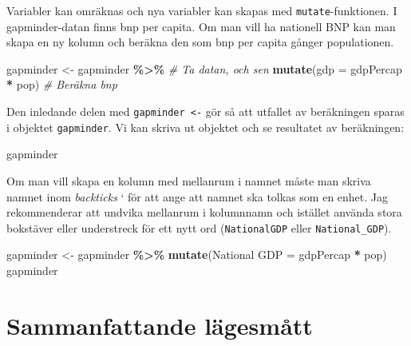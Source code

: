 \documentclass[
]{book}
\newenvironment{Shaded}{\begin{snugshade}}{\end{snugshade}}
\newcommand{\AttributeTok}[1]{\textcolor[rgb]{0.13,0.29,0.53}{#1}}
\newcommand{\CommentTok}[1]{\textcolor[rgb]{0.56,0.35,0.01}{\textit{#1}}}
\newcommand{\FunctionTok}[1]{\textcolor[rgb]{0.13,0.29,0.53}{\textbf{#1}}}
\newcommand{\NormalTok}[1]{#1}
\newcommand{\OtherTok}[1]{\textcolor[rgb]{0.56,0.35,0.01}{#1}}
\newcommand{\SpecialCharTok}[1]{\textcolor[rgb]{0.81,0.36,0.00}{\textbf{#1}}}
\newcommand{\StringTok}[1]{\textcolor[rgb]{0.31,0.60,0.02}{#1}}
\theoremstyle{definition}
\theoremstyle{definition}
\theoremstyle{definition}
\theoremstyle{definition}
\theoremstyle{remark}
\begin{document}
Variabler kan omräknas och nya variabler kan skapas med \texttt{mutate}-funktionen. I gapminder-datan finns bnp per capita. Om man vill ha nationell BNP kan man skapa en ny kolumn och beräkna den som bnp per capita gånger populationen.

\begin{Shaded}
\begin{Highlighting}[]
\NormalTok{gapminder }\OtherTok{\textless{}{-}}\NormalTok{ gapminder }\SpecialCharTok{\%\textgreater{}\%}             \CommentTok{\# Ta datan, och sen}
  \FunctionTok{mutate}\NormalTok{(}\AttributeTok{gdp =}\NormalTok{ gdpPercap }\SpecialCharTok{*}\NormalTok{ pop)        }\CommentTok{\# Beräkna bnp}
\end{Highlighting}
\end{Shaded}

Den inledande delen med \texttt{gapminder\ \textless{}-} gör så att utfallet av beräkningen sparas i objektet \texttt{gapminder}.
Vi kan skriva ut objektet och se resultatet av beräkningen:

\begin{Shaded}
\begin{Highlighting}[]
\NormalTok{gapminder}
\end{Highlighting}
\end{Shaded}

Om man vill skapa en kolumn med mellanrum i namnet måste man skriva namnet inom \emph{backticks} ` för att ange att namnet ska tolkas som en enhet. Jag rekommenderar att undvika mellanrum i kolumnnamn och istället använda stora bokstäver eller understreck för ett nytt ord (\texttt{NationalGDP} eller \texttt{National\_GDP}).

\begin{Shaded}
\begin{Highlighting}[]
\NormalTok{gapminder }\OtherTok{\textless{}{-}}\NormalTok{ gapminder }\SpecialCharTok{\%\textgreater{}\%} 
  \FunctionTok{mutate}\NormalTok{(}\StringTok{\textasciigrave{}}\AttributeTok{National GDP}\StringTok{\textasciigrave{}} \OtherTok{=}\NormalTok{ gdpPercap }\SpecialCharTok{*}\NormalTok{ pop)}
\NormalTok{gapminder}
\end{Highlighting}
\end{Shaded}

\section{Sammanfattande lägesmått}\label{sammanfattande-luxe4gesmuxe5tt}
\end{document}
